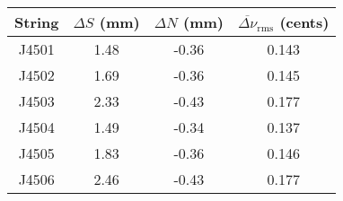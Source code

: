 \begin{tabular}{cccc}
\toprule
String & $\Delta S$ (mm) & $\Delta N$ (mm) & $\overline{\Delta \nu}_\text{rms}$ (cents) \\
\midrule
J4501 & 1.48 & -0.36 & 0.143 \\
J4502 & 1.69 & -0.36 & 0.145 \\
J4503 & 2.33 & -0.43 & 0.177 \\
J4504 & 1.49 & -0.34 & 0.137 \\
J4505 & 1.83 & -0.36 & 0.146 \\
J4506 & 2.46 & -0.43 & 0.177 \\
\bottomrule
\end{tabular}
